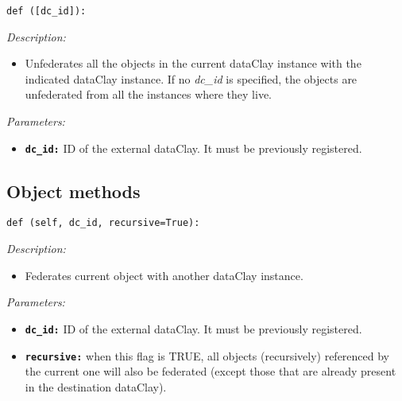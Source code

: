 \begin{dBox}

\texttt{def ([dc\_id]):}
\LINE

{\it Description:}

\begin{itemize}
  \item Unfederates all the objects in the current dataClay instance with the indicated dataClay instance. If no \textit{dc\_id} is specified, the objects are unfederated from all the instances where they live.
\end{itemize}

{\it Parameters:}

\begin{itemize}
  \item \texttt{\bfseries dc\_id:} ID of the external dataClay. It must be previously registered.
\end{itemize}

\end{dBox}

\subsection{Object methods}
\label{sec:PythonFederationObject}

\begin{dBox}
\texttt{def (self, dc\_id, recursive=True):}
\LINE

{\it Description:}

\begin{itemize}
  \item Federates current object with another dataClay instance. 
\end{itemize}

{\it Parameters:}

\begin{itemize}
  \item \texttt{\bfseries dc\_id:} ID of the external dataClay. It must be previously registered.
  \item \texttt{\bfseries recursive:} when this flag is TRUE, all objects (recursively) referenced by the current one will also be federated (except those that are already present in the destination dataClay). 
\end{itemize}

\end{dBox}


